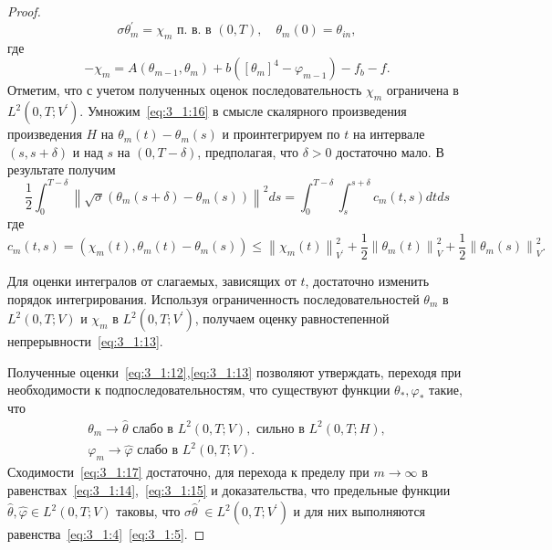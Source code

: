 \begin{proof}
    \begin{equation}
        \label{eq:3_1:16}
        \sigma \theta_{m}^{\prime}=\chi_{m}
        \text { п. в. в }(0, T), \quad \theta_{m}(0)=\theta_{i n},
    \end{equation}
    где
    \[
        -\chi_{m}=A\left(\theta_{m-1},
        \theta_{m}\right)+b\left(\left[\theta_{m}\right]^{4}
        -\varphi_{m-1}\right)-f_{b}-f.
    \]
    Отметим, что с учетом полученных оценок последовательность
    $\chi_{m}$ ограничена в $L^{2}\left(0, T ; V^{\prime}\right)$.
    Умножим~\eqref{eq:3_1:16} в смысле скалярного произведения произведения
    $H$ на $\theta_{m}(t)-\theta_{m}(s)$
    и проинтегрируем по $t$ на интервале $(s, s+\delta)$ и
    над $s$ на $(0, T-\delta)$, предполагая, что $\delta>0$ достаточно мало.
    В результате получим
    \[
        \frac{1}{2} \int_{0}^{T-\delta}\left\|\sqrt{\sigma}\left(\theta_{m}(s+\delta)
        - \theta_{m}(s)\right)\right\|^{2} d s
        = \int_{0}^{T-\delta} \int_{s}^{s+\delta} c_{m}(t, s) d t d s
    \]
    где
    \[
        c_{m}(t, s)=\left(\chi_{m}(t), \theta_{m}(t)-\theta_{m}(s)\right)
        \leq\left\|\chi_{m}(t)\right\|_{V^{\prime}}^{2}
        +\frac{1}{2}\left\|\theta_{m}(t)\right\|_{V}^{2}
        +\frac{1}{2}\left\|\theta_{m}(s)\right\|_{V}^{2}.
    \]

    Для оценки интегралов от слагаемых, зависящих от $t$,
    достаточно изменить порядок интегрирования.
    Используя ограниченность последовательностей
    $\theta_{m}$ в $L^{2}(0, T ; V)$ и $\chi_{m}$ в $L^{2}\left(0, T ; V^{\prime}\right)$,
    получаем оценку равностепенной непрерывности~\eqref{eq:3_1:13}.

    Полученные оценки~\eqref{eq:3_1:12},\eqref{eq:3_1:13}
    позволяют утверждать,
    переходя при необходимости к подпоследовательностям,
    что существуют функции $\theta_{*}, \varphi_{*}$ такие, что
    \begin{equation}
        \label{eq:3_1:17}
        \begin{aligned}
            \theta_{m} \rightarrow \widehat{\theta}
            \text { слабо в } L^{2}(0, T ; V),
            \text { сильно в } L^{2}(0, T ; H), \\
            \varphi_{m} \rightarrow \widehat{\varphi}
            \text { слабо в } L^{2}(0, T ; V).
        \end{aligned}
    \end{equation}
    Сходимости~\eqref{eq:3_1:17} достаточно, для перехода к пределу
    при $m \rightarrow \infty$
    в равенствах~\eqref{eq:3_1:14},~\eqref{eq:3_1:15}
    и доказательства, что предельные функции $\widehat{\theta},
    \widehat{\varphi } \in L^{2}(0, T ; V)$ таковы,
    что $\sigma \widehat{\theta}^{\prime} \in L^{2}\left(0, T ; V^{ \prime}\right)$
    и для них выполняются равенства~\eqref{eq:3_1:4}~\eqref{eq:3_1:5}.
\end{proof}

